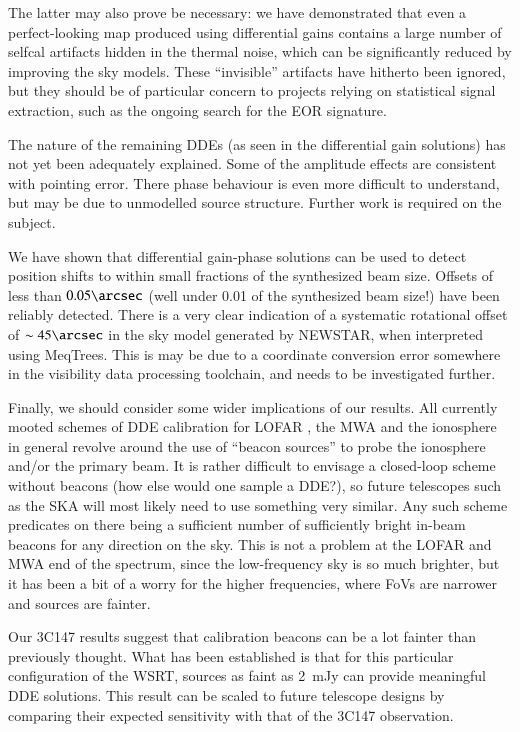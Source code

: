 \documentclass[]{aa}
\begin{document}
The latter may also prove be necessary: we have demonstrated that even a perfect-looking map produced using differential gains contains a large number of selfcal artifacts hidden in the thermal noise, which can be significantly reduced by improving the sky models. These ``invisible'' artifacts have hitherto been ignored, but they should be of particular concern to projects relying on statistical signal extraction, such as the ongoing search for the EOR signature.

The nature of the remaining DDEs (as seen in the differential gain solutions) has not yet been adequately explained. Some of the amplitude effects are consistent with pointing error. There phase behaviour is even more difficult to understand, but may be due to unmodelled source structure. Further work is required on the subject. 

We have shown that differential gain-phase solutions can be used to detect position shifts to within small fractions of the synthesized beam size. Offsets of less than $0.05\arcsec$ (well under 0.01 of the synthesized beam size!) have been reliably detected. There is a very clear indication of a systematic rotational offset of $\sim45\arcsec$ in the sky model generated by NEWSTAR, when interpreted using MeqTrees. This is may be due to a coordinate conversion error somewhere in the visibility data processing toolchain, and needs to be investigated further.

Finally, we should consider some wider implications of our results. All currently mooted schemes of DDE calibration for LOFAR \citep{JEN:LOFAR3}, the MWA \citep{Mitchell:MWA-cal} and the ionosphere in general \citep{Intema:SPAM,Cotton:FBC} revolve around the use of ``beacon sources'' to probe the ionosphere and/or the primary beam. It is rather difficult to envisage a closed-loop scheme without beacons (how else would one sample a DDE?), so future telescopes such as the SKA will most likely need to use something very similar. Any such scheme predicates on there being a sufficient number of sufficiently bright in-beam beacons for any direction on the sky. This is not a problem at the LOFAR and MWA end of the spectrum, since the low-frequency sky is so much brighter, but it has been a bit of a worry for the higher frequencies, where FoVs are narrower and sources are fainter.

Our 3C147 results suggest that calibration beacons can be a lot fainter than previously thought. What has been established is that for this particular configuration of the WSRT, sources as faint as 2~mJy can provide meaningful DDE solutions. This result can be scaled to future telescope designs by comparing their expected sensitivity with that of the 3C147 observation.
\end{document}
